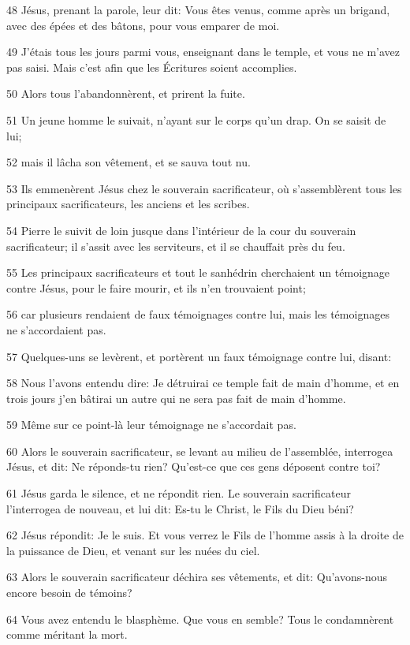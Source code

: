 \par 48 Jésus, prenant la parole, leur dit: Vous êtes venus, comme après un brigand, avec des épées et des bâtons, pour vous emparer de moi.
\par 49 J'étais tous les jours parmi vous, enseignant dans le temple, et vous ne m'avez pas saisi. Mais c'est afin que les Écritures soient accomplies.
\par 50 Alors tous l'abandonnèrent, et prirent la fuite.
\par 51 Un jeune homme le suivait, n'ayant sur le corps qu'un drap. On se saisit de lui;
\par 52 mais il lâcha son vêtement, et se sauva tout nu.
\par 53 Ils emmenèrent Jésus chez le souverain sacrificateur, où s'assemblèrent tous les principaux sacrificateurs, les anciens et les scribes.
\par 54 Pierre le suivit de loin jusque dans l'intérieur de la cour du souverain sacrificateur; il s'assit avec les serviteurs, et il se chauffait près du feu.
\par 55 Les principaux sacrificateurs et tout le sanhédrin cherchaient un témoignage contre Jésus, pour le faire mourir, et ils n'en trouvaient point;
\par 56 car plusieurs rendaient de faux témoignages contre lui, mais les témoignages ne s'accordaient pas.
\par 57 Quelques-uns se levèrent, et portèrent un faux témoignage contre lui, disant:
\par 58 Nous l'avons entendu dire: Je détruirai ce temple fait de main d'homme, et en trois jours j'en bâtirai un autre qui ne sera pas fait de main d'homme.
\par 59 Même sur ce point-là leur témoignage ne s'accordait pas.
\par 60 Alors le souverain sacrificateur, se levant au milieu de l'assemblée, interrogea Jésus, et dit: Ne réponds-tu rien? Qu'est-ce que ces gens déposent contre toi?
\par 61 Jésus garda le silence, et ne répondit rien. Le souverain sacrificateur l'interrogea de nouveau, et lui dit: Es-tu le Christ, le Fils du Dieu béni?
\par 62 Jésus répondit: Je le suis. Et vous verrez le Fils de l'homme assis à la droite de la puissance de Dieu, et venant sur les nuées du ciel.
\par 63 Alors le souverain sacrificateur déchira ses vêtements, et dit: Qu'avons-nous encore besoin de témoins?
\par 64 Vous avez entendu le blasphème. Que vous en semble? Tous le condamnèrent comme méritant la mort.
